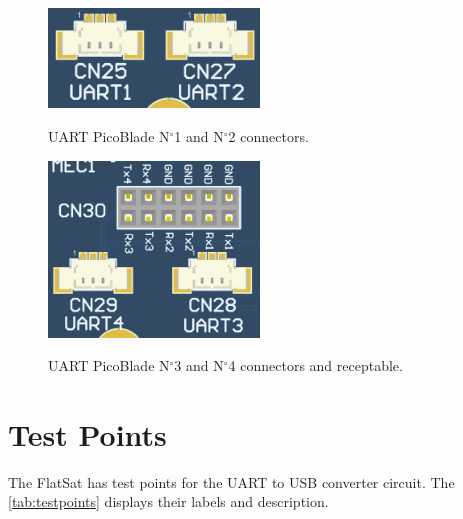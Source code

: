 \begin{figure}[!ht]
    \begin{center}
        \includegraphics[width=0.5\textwidth]{figures/picoblade_uarts_n1_and_n2}
        \caption{UART PicoBlade N$^{\circ}$1 and N$^{\circ}$2 connectors.}
        \label{fig:uart-picoblades-1}
        \includegraphics[width=0.5\textwidth]{figures/picoblade_uarts_n3_and_n4_and_receptable.png}
        \caption{UART PicoBlade N$^{\circ}$3 and N$^{\circ}$4 connectors and receptable.}
        \label{fig:uart-picoblades-2}
    \end{center}
\end{figure}

\section{Test Points}

The FlatSat has test points for the UART to USB converter circuit. The \autoref{tab:testpoints} displays their labels and description.

